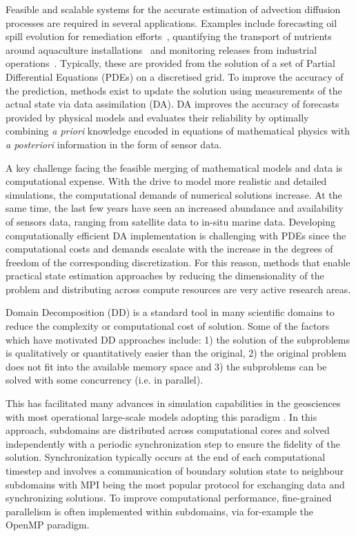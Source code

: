 \documentclass[conference,compsoc]{IEEEtran}
\begin{document}
Feasible and scalable systems for the accurate estimation of advection diffusion processes are required in several applications. Examples include forecasting oil spill evolution for remediation efforts~\cite{guo2009modeling}, quantifying the transport of nutrients around aquaculture installations~\cite{odonncha2013physical} and monitoring releases from industrial operations~\cite{koziy1998three}.  Typically, these are provided from the solution of a set of Partial Differential Equations (PDEs) on a discretised grid. To improve the accuracy of the prediction, methods exist to update the solution using measurements of the actual state via data assimilation (DA). DA improves the accuracy of forecasts provided by physical models and evaluates their reliability by optimally combining \emph{a priori} knowledge encoded in equations of mathematical physics with \emph{a posteriori} information in the form of sensor data. 

A key challenge facing the feasible merging of mathematical models and data is computational expense. With the drive to model more realistic and detailed simulations, the computational demands of numerical solutions increase. At the same time, the last few years have seen an increased abundance and availability of sensors data, ranging from satellite data to in-situ marine data. Developing computationally efficient DA implementation is challenging with PDEs since the computational costs and demands escalate with the increase in the degrees of freedom of the corresponding discretization. For this reason, methods that enable practical state estimation approaches by reducing the dimensionality of the problem and distributing across compute resources are very active research areas. 

Domain Decomposition (DD) is a standard tool in many scientific domains to reduce the complexity or computational cost of solution. Some of the factors which have motivated DD approaches include: 1) the solution of the subproblems is qualitatively or quantitatively easier than the original, 2) the original problem does not fit into the available memory space and 3) the subproblems can be solved with some concurrency (i.e. in parallel).

This has facilitated many advances in simulation capabilities in the geosciences with most operational large-scale models adopting this paradigm \cite{michalakes2001development, hu2013scalable, hammond2014evaluating}. In this approach, subdomains are distributed across computational cores and solved independently with a periodic synchronization step to ensure the fidelity of the solution. Synchronization typically occurs at the end of each computational timestep and involves a communication of boundary solution state to neighbour subdomains with MPI being the most popular protocol for exchanging data and synchronizing solutions. To improve computational performance, fine-grained parallelism is often implemented within subdomains, via for-example the OpenMP paradigm.
\end{document}
